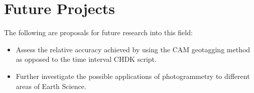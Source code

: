 \section{Future Projects}

The following are proposals for future research into this field:

\begin{itemize}
    \item Assess the relative accuracy achieved by using the CAM geotagging
        method as opposed to the time interval CHDK script.
    \item Further investigate the possible applications of photogrammetry to
        different areas of Earth Science.
\end{itemize}
